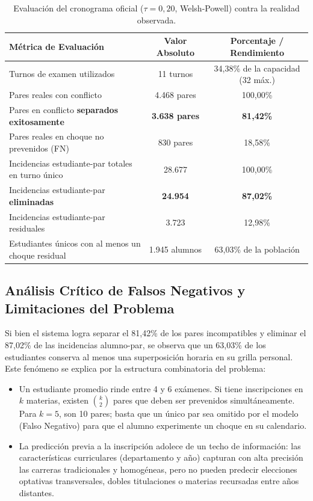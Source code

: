 \documentclass[11pt,a4paper]{article}
\begin{document}
\begin{table}[htbp]
\centering
\caption{Evaluación del cronograma oficial ($\tau = 0,20$, Welsh-Powell) contra la realidad observada.}
\label{tab:evaluation_results}
\begin{tabularx}{\textwidth}{lcc}
\toprule
\textbf{Métrica de Evaluación} & \textbf{Valor Absoluto} & \textbf{Porcentaje / Rendimiento} \\
\midrule
Turnos de examen utilizados & 11 turnos & 34,38\% de la capacidad (32 máx.) \\
Pares reales con conflicto & 4.468 pares & 100,00\% \\
Pares en conflicto \textbf{separados exitosamente} & \textbf{3.638 pares} & \textbf{81,42\%} \\
Pares reales en choque no prevenidos (FN) & 830 pares & 18,58\% \\
Incidencias estudiante-par totales en turno único & 28.677 & 100,00\% \\
Incidencias estudiante-par \textbf{eliminadas} & \textbf{24.954} & \textbf{87,02\%} \\
Incidencias estudiante-par residuales & 3.723 & 12,98\% \\
Estudiantes únicos con al menos un choque residual & 1.945 alumnos & 63,03\% de la población \\
\bottomrule
\end{tabularx}
\end{table}

\subsection{Análisis Crítico de Falsos Negativos y Limitaciones del Problema}
Si bien el sistema logra separar el 81,42\% de los pares incompatibles y eliminar el 87,02\% de las incidencias alumno-par, se observa que un 63,03\% de los estudiantes conserva al menos una superposición horaria en su grilla personal. Este fenómeno se explica por la estructura combinatoria del problema:
\begin{itemize}
    \item Un estudiante promedio rinde entre 4 y 6 exámenes. Si tiene inscripciones en $k$ materias, existen $\binom{k}{2}$ pares que deben ser prevenidos simultáneamente. Para $k = 5$, son 10 pares; basta que un único par sea omitido por el modelo (Falso Negativo) para que el alumno experimente un choque en su calendario.
    \item La predicción previa a la inscripción adolece de un techo de información: las características curriculares (departamento y año) capturan con alta precisión las carreras tradicionales y homogéneas, pero no pueden predecir elecciones optativas transversales, dobles titulaciones o materias recursadas entre años distantes.
\end{itemize}
\end{document}
